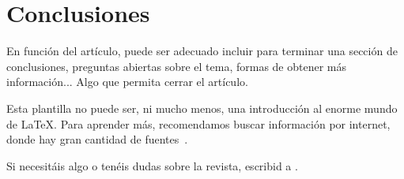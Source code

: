 \documentclass{TEMat-article}
\begin{document}
\section{Conclusiones}

En función del artículo, puede ser adecuado incluir para terminar una sección de conclusiones, preguntas abiertas sobre el tema, formas de obtener más información...
Algo que permita cerrar el artículo.

Esta plantilla no puede ser, ni mucho menos, una introducción al enorme mundo de \LaTeX.
Para aprender más, recomendamos buscar información por internet, donde hay gran cantidad de fuentes~\cite{wiki:latex, stackexchange, texample}.

Si necesitáis algo o tenéis dudas sobre la revista, escribid a .

\nocite{*}
\printbibliography[heading=bibintoc]
\end{document}

